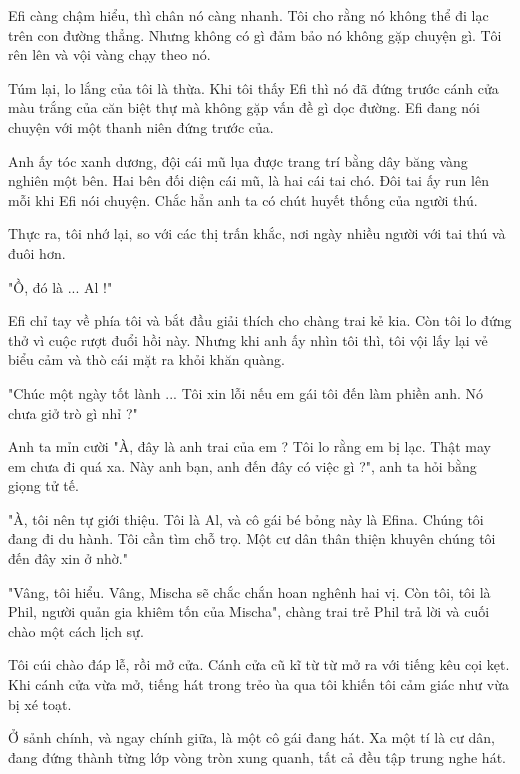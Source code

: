 Efi càng chậm hiểu, thì chân nó càng nhanh. Tôi cho rằng nó không thể đi lạc trên con đường thẳng. Nhưng không có gì đảm bảo nó không gặp chuyện gì. Tôi rên lên và vội vàng chạy theo nó.

Túm lại, lo lắng của tôi là thừa. Khi tôi thấy Efi thì nó đã đứng trước cánh cửa màu trắng của căn biệt thự mà không gặp vấn đề gì dọc đường. Efi đang nói chuyện với một thanh niên đứng trước của. 

Anh ấy tóc xanh dương, đội cái mũ lụa được trang trí bằng dây băng vàng nghiên một bên. Hai bên đối diện cái mũ, là hai cái tai chó. Đôi tai ấy run lên mỗi khi Efi nói chuyện. Chắc hẳn anh ta có chút huyết thống của người thú.

Thực ra, tôi nhớ lại, so với các thị trấn khắc, nơi ngày nhiều người với tai thú và đuôi hơn. 

"Ồ, đó là ... Al !"

Efi chỉ tay về phía tôi và bắt đầu giải thích cho chàng trai kẻ kia. Còn tôi lo đứng thở vì cuộc rượt đuổi hồi này. Nhưng khi anh ấy nhìn tôi thì, tôi vội lấy lại vẻ biểu cảm và thò cái mặt ra khỏi khăn quàng.

"Chúc một ngày tốt lành ... Tôi xin lỗi nếu em gái tôi đến làm phiền anh. Nó chưa giở trò gì nhỉ ?"

Anh ta mỉn cười "À, đây là anh trai của em ? Tôi lo rằng em bị lạc. Thật may em chưa đi quá xa. Này anh bạn, anh đến đây có việc gì ?", anh ta hỏi bằng giọng tử tế.

"À, tôi nên tự giới thiệu. Tôi là Al, và cô gái bé bỏng này là Efina. Chúng tôi đang đi du hành. Tôi cần tìm chỗ trọ. Một cư dân thân thiện khuyên chúng tôi đến đây xin ở nhờ."

"Vâng, tôi hiểu. Vâng, Mischa sẽ chắc chắn hoan nghênh hai vị. Còn tôi, tôi là Phil, người quản gia khiêm tốn của Mischa", chàng trai trẻ Phil trả lời và cuối chào một cách lịch sự. 

Tôi cúi chào đáp lễ, rồi mở cửa. Cánh cửa cũ kĩ từ từ mở ra với tiếng kêu cọi kẹt.\\



Khi cánh cửa vừa mở, tiếng hát trong trẻo ùa qua tôi khiến tôi cảm giác như vừa bị xé toạt. 

Ở sảnh chính, và ngay chính giữa, là một cô gái đang hát. Xa một tí là cư dân, đang đứng thành từng lớp vòng tròn xung quanh, tất cả đều tập trung nghe hát.

